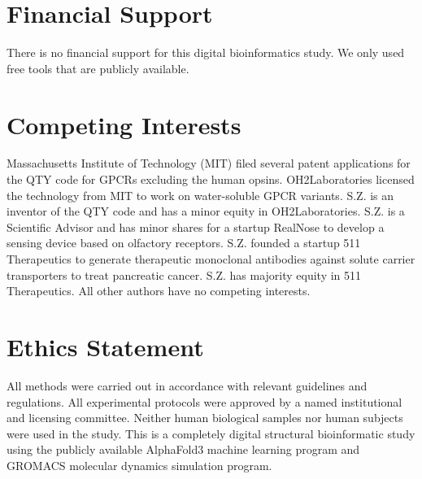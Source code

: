 \documentclass[fleqn, 10pt, lineno]{manuscript}
\begin{document}
\section*{Financial Support}

There is no financial support for this digital bioinformatics study. We only used free tools that are publicly available. 

\section*{Competing Interests}

Massachusetts Institute of Technology (MIT) filed several patent applications for the QTY code for GPCRs excluding the human opsins. OH2Laboratories licensed the technology from MIT to work on water-soluble GPCR variants. S.Z. is an inventor of the QTY code and has a minor equity in OH2Laboratories. S.Z. is a Scientific Advisor and has minor shares for a startup RealNose to develop a sensing device based on olfactory receptors. S.Z. founded a startup 511 Therapeutics to generate therapeutic monoclonal antibodies against solute carrier transporters to treat pancreatic cancer. S.Z. has majority equity in 511 Therapeutics. All other authors have no competing interests.


\section*{Ethics Statement}

All methods were carried out in accordance with relevant guidelines and regulations. All experimental protocols were approved by a named institutional and licensing committee. Neither human biological samples nor human subjects were used in the study. This is a completely digital structural bioinformatic study using the publicly available AlphaFold3 machine learning program and GROMACS molecular dynamics simulation program.



\end{document}
